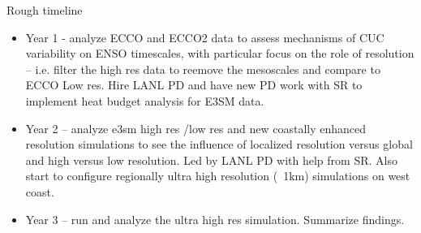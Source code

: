 Rough timeline
\begin{itemize}
    \item Year 1 - analyze ECCO and ECCO2 data to assess mechanisms of CUC variability on ENSO timescales, with particular focus on the role of resolution -- i.e. filter the high res data to reemove the mesoscales and compare to ECCO Low res.  Hire LANL PD and have new PD work with SR to implement heat budget analysis for E3SM data.
    \item Year 2 -- analyze e3sm high res /low res and new coastally enhanced resolution simulations to see the influence of localized resolution versus global and high versus low resolution.  Led by LANL PD with help from SR.   Also start to configure regionally ultra high resolution (~1km) simulations on west coast.
    \item Year 3 -- run and analyze the ultra high res simulation.  Summarize findings.
\end{itemize}
